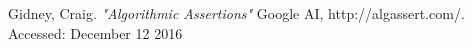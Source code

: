 \documentclass[a4paper]{article}
\begin{document}
\begin{thebibliography}{9}
	Gidney, Craig. \emph{"Algorithmic Assertions"} Google AI, http://algassert.com/. Accessed: December 12 2016 
 %

\end{thebibliography}
\end{document}
